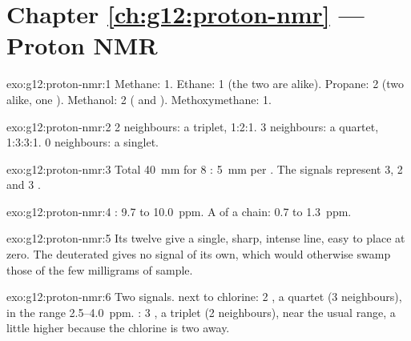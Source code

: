 \section*{Chapter \ref{ch:g12:proton-nmr} --- Proton NMR}

\begin{solution}{exo:g12:proton-nmr:1}
Methane: 1. Ethane: 1 (the two  are alike). Propane: 2 (two
 alike, one ). Methanol: 2 ( and ).
Methoxymethane: 1.
\end{solution}

\begin{solution}{exo:g12:proton-nmr:2}
2 neighbours: a triplet, 1:2:1. 3 neighbours: a quartet, 1:3:3:1.
0 neighbours: a singlet.
\end{solution}

\begin{solution}{exo:g12:proton-nmr:3}
Total \qty{40}{mm} for 8 : \qty{5}{mm} per . The signals
represent 3, 2 and 3 .
\end{solution}

\begin{solution}{exo:g12:proton-nmr:4}
: 9.7 to \qty{10.0}{ppm}. A  of a chain: 0.7 to
\qty{1.3}{ppm}.
\end{solution}

\begin{solution}{exo:g12:proton-nmr:5}
Its twelve  give a single, sharp, intense line, easy
to place at zero. The deuterated  gives no  signal of its
own, which would otherwise swamp those of the few milligrams of sample.
\end{solution}

\begin{solution}{exo:g12:proton-nmr:6}
Two signals.  next to chlorine: 2 , a quartet (3
neighbours), in the range 2.5--\qty{4.0}{ppm}. : 3 , a
triplet (2 neighbours), near the usual  range, a little higher
because the chlorine is two  away.
\end{solution}

